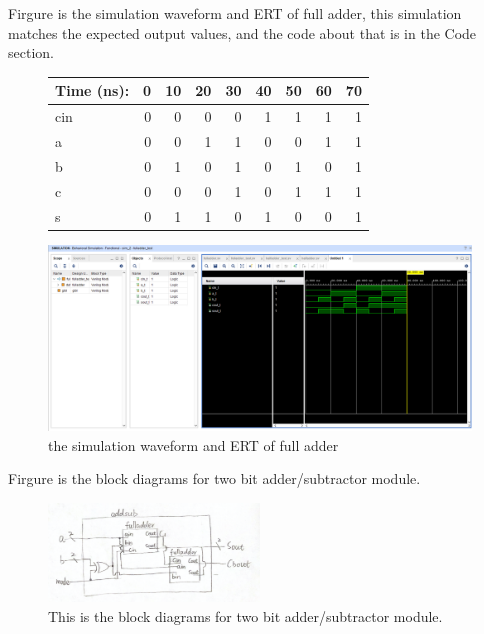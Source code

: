 \documentclass[11pt]{article}
\begin{document}
Firgure is the simulation waveform and ERT of full adder, this simulation matches the expected output values, and the code about that is in the Code section. \\
\begin{figure}[ht]\centering
	\begin{tabular}{l|rrrr|rrrr}
		Time (ns): & 0 & 10 & 20 & 30 & 40 & 50 & 60 & 70\\
		\midrule
		cin & 0 & 0 & 0 & 0 & 1 & 1 & 1 & 1 \\
		a & 0 & 0 & 1 & 1 & 0 & 0 & 1 & 1 \\
		b & 0 & 1 & 0 & 1 & 0 & 1 & 0 & 1 \\
		\midrule
		c & 0 & 0 & 0 & 1 & 0 & 1 & 1 & 1 \\
		s & 0 & 1 & 1 & 0 & 1 & 0 & 0 & 1\\
		\bottomrule
	\end{tabular}\medskip
		
	\includegraphics{FullAdderSimulation}
	\caption{the simulation waveform and ERT of full adder}
	\label{fig:FullAdderSimulation}
\end{figure}

Firgure is the block diagrams for two bit adder/subtractor module. \\
\begin{figure}[ht]\centering    
	\includegraphics[width=0.5\textwidth]{addsub}    
	\caption{This is the block diagrams for two bit adder/subtractor module.}    
	\label{fig:addsub}
\end{figure}
\end{document}
